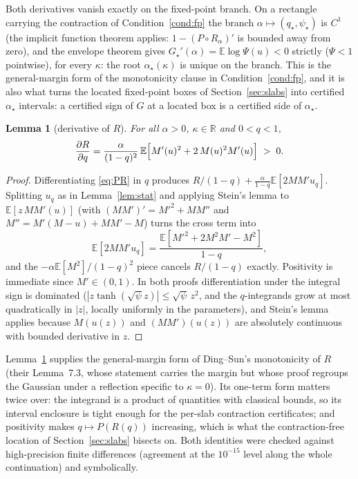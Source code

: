 \documentclass[11pt]{article}
\newtheorem{lemma}{Lemma}
\theoremstyle{remark}
\newcommand{\E}{\mathbb{E}}
\newcommand{\R}{\mathbb{R}}
\begin{document}
Both derivatives vanish exactly on the fixed-point branch.  On a
rectangle carrying the contraction of Condition~\ref{cond:fp} the
branch $\alpha\mapsto(q_\star,\psi_\star)$ is $C^1$ (the implicit
function theorem applies: $1-(P\circ R_\alpha)'$ is bounded away
from zero), and the envelope theorem gives
$G_\star'(\alpha)=\E\log\Psi(u)<0$ strictly ($\Psi<1$ pointwise), for
every $\kappa$: the root $\alpha_\star(\kappa)$ is unique on the
branch.  This is the
general-margin form of the monotonicity clause in
Condition~\ref{cond:fp}, and it is also what turns the located
fixed-point boxes of Section~\ref{sec:slabs} into certified
$\alpha_\star$ intervals: a certified sign of $G$ at a located box is
a certified side of $\alpha_\star$.

\begin{lemma}[derivative of $R$]\label{lem:dR}
For all $\alpha>0$, $\kappa\in\R$ and $0<q<1$,
\[
\frac{\partial R}{\partial q}
=\frac{\alpha}{(1-q)^2}\,
\E\Bigl[M'(u)^2+2\,M(u)^2M'(u)\Bigr]\;>\;0 .
\]
\end{lemma}

\begin{proof}
Differentiating \eqref{eq:PR} in $q$ produces
$R/(1-q)+\tfrac{\alpha}{1-q}\E[2MM'u_q]$.  Splitting $u_q$ as in
Lemma~\ref{lem:stat} and applying Stein's lemma to
$\E[z\,MM'(u)]$ (with $(MM')'=M'^2+MM''$ and
$M''=M'(M-u)+MM'-M$) turns the cross term into
\[
\E[2MM'u_q]=\frac{\E[M'^2+2M^2M'-M^2]}{1-q},
\]
and the $-\alpha\E[M^2]/(1-q)^2$ piece cancels $R/(1-q)$ exactly.
Positivity is immediate since $M'\in(0,1)$.  In both proofs
differentiation under the integral sign is dominated
($|z\tanh(\sqrt\psi z)|\le\sqrt\psi\,z^2$, and the $q$-integrands
grow at most quadratically in $|z|$, locally uniformly in the
parameters), and Stein's lemma applies because $M(u(z))$ and
$(MM')(u(z))$ are absolutely continuous with bounded derivative in
$z$.
\end{proof}

Lemma~\ref{lem:dR} supplies the general-margin form of Ding--Sun's
monotonicity of $R$ (their Lemma~7.3, whose statement carries the
margin but whose proof regroups the Gaussian under a reflection
specific to $\kappa=0$).  Its one-term form
matters twice over: the integrand is a product of quantities with
classical bounds, so its interval enclosure is tight enough for the
per-slab contraction certificates; and positivity makes
$q\mapsto P(R(q))$ increasing, which is what the contraction-free
location of Section~\ref{sec:slabs} bisects on.  Both identities were
checked against high-precision finite differences (agreement at the
$10^{-15}$ level along the whole continuation) and symbolically.
\end{document}
